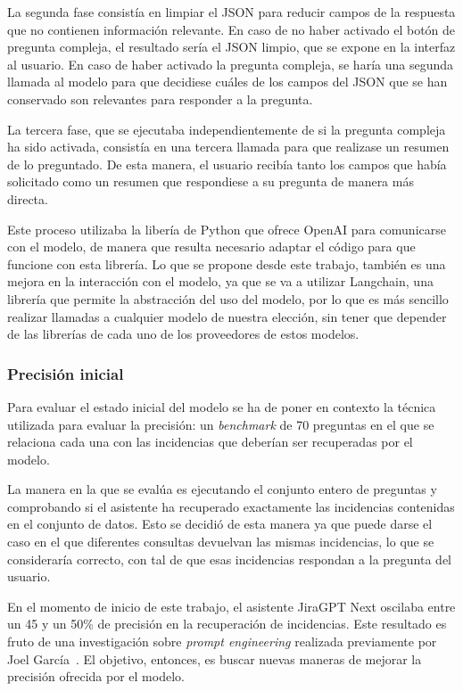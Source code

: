 La segunda fase consistía en limpiar el JSON para reducir campos de la respuesta que no contienen información relevante. En caso de no haber activado el botón de pregunta compleja, el resultado sería el JSON limpio, que se expone en la interfaz al usuario. En caso de haber activado la pregunta compleja, se haría una segunda llamada al modelo para que decidiese cuáles de los campos del JSON que se han conservado son relevantes para responder a la pregunta.

La tercera fase, que se ejecutaba independientemente de si la pregunta compleja ha sido activada, consistía en una tercera llamada para que realizase un resumen de lo preguntado. De esta manera, el usuario recibía tanto los campos que había solicitado como un resumen que respondiese a su pregunta de manera más directa.

Este proceso utilizaba la libería de Python que ofrece OpenAI para comunicarse con el modelo, de manera que resulta necesario adaptar el código para que funcione con esta librería. Lo que se propone desde este trabajo, también es una mejora en la interacción con el modelo, ya que se va a utilizar Langchain, una librería que permite la abstracción del uso del modelo, por lo que es más sencillo realizar llamadas a cualquier modelo de nuestra elección, sin tener que depender de las librerías de cada uno de los proveedores de estos modelos.

\subsubsection{Precisión inicial}
Para evaluar el estado inicial del modelo se ha de poner en contexto la técnica utilizada para evaluar la precisión: un \textit{benchmark} de 70 preguntas en el que se relaciona cada una con las incidencias que deberían ser recuperadas por el modelo.

La manera en la que se evalúa es ejecutando el conjunto entero de preguntas y comprobando si el asistente ha recuperado exactamente las incidencias contenidas en el conjunto de datos. Esto se decidió de esta manera ya que puede darse el caso en el que diferentes consultas devuelvan las mismas incidencias, lo que se consideraría correcto, con tal de que esas incidencias respondan a la pregunta del usuario.

En el momento de inicio de este trabajo, el asistente JiraGPT Next oscilaba entre un 45 y un 50\% de precisión en la recuperación de incidencias. Este resultado es fruto de una investigación sobre \textit{prompt engineering} realizada previamente por Joel García~\cite{jiragpt}. El objetivo, entonces, es buscar nuevas maneras de mejorar la precisión ofrecida por el modelo.